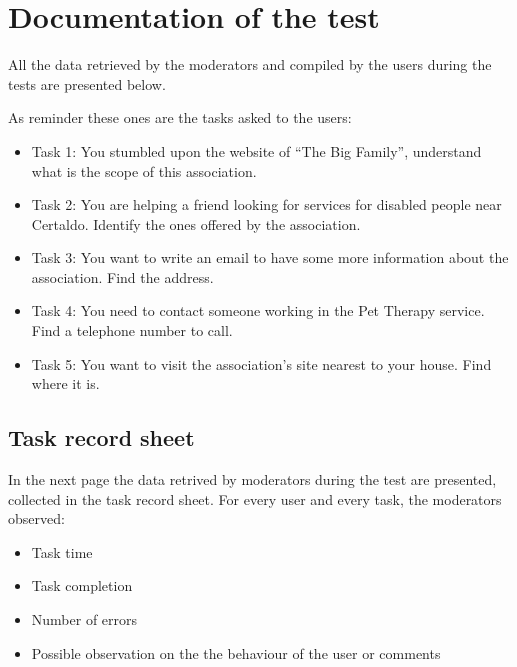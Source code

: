 \section{Documentation of the test}
All the data retrieved by the moderators and compiled by the users during the tests are presented below.

As reminder these ones are the tasks asked to the users:
\begin{itemize}
\item Task 1: You stumbled upon the website of ``The Big Family'', understand what is the scope of this association.
\item Task 2: You are helping a friend looking for services for disabled people near Certaldo. Identify the ones offered by the association.
\item Task 3: You want to write an email to have some more information about the association. Find the address.
\item Task 4: You need to contact someone working in the Pet Therapy service. Find a telephone number to call.
\item Task 5: You want to visit the association’s site nearest to your house. Find where it is.
\end{itemize}

\subsection{Task record sheet}
In the next page the data retrived by moderators during the test are presented, collected in the task record sheet. For every user and every task, the moderators observed:
\begin{itemize}
\item Task time
\item Task completion
\item Number of errors
\item Possible observation on the the behaviour of the user or comments
\end{itemize}

